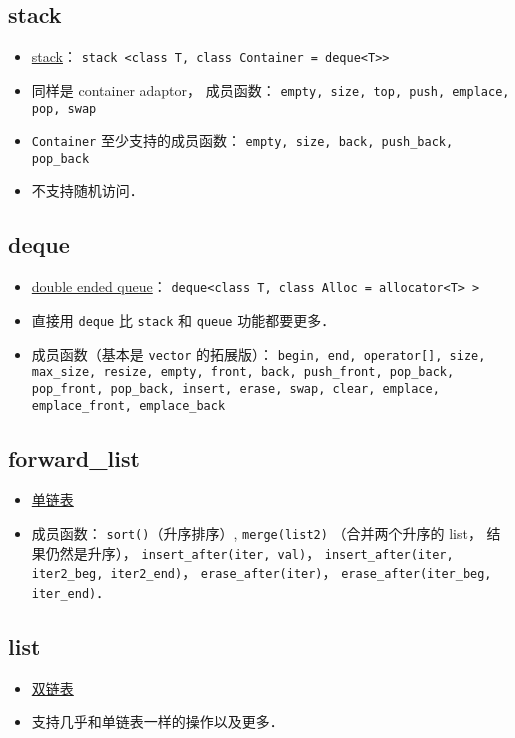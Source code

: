 \subsection{stack}
\begin{itemize}
\item \href{https://cplusplus.com/reference/stack/stack/}{stack}： \verb|stack <class T, class Container = deque<T>>|
\item 同样是 container adaptor， 成员函数： \verb|empty, size, top, push, emplace, pop, swap|
\item \verb|Container| 至少支持的成员函数： \verb|empty, size, back, push_back, pop_back|
\item 不支持随机访问．
\end{itemize}

\subsection{deque}
\begin{itemize}
\item \href{https://cplusplus.com/reference/deque/deque/}{double ended queue}： \verb|deque<class T, class Alloc = allocator<T> >|
\item 直接用 \verb|deque| 比 \verb|stack| 和 \verb|queue| 功能都要更多．
\item 成员函数（基本是 \verb|vector| 的拓展版）： \verb|begin, end, operator[], size, max_size, resize, empty, front, back, push_front, pop_back, pop_front, pop_back, insert, erase, swap, clear, emplace, emplace_front, emplace_back|
\end{itemize}

\subsection{forward\_list}
\begin{itemize}
\item \href{https://cplusplus.com/reference/forward_list/forward_list/}{单链表}
\item 成员函数： \verb|sort()|（升序排序）, \verb|merge(list2)| （合并两个升序的 list， 结果仍然是升序）， \verb|insert_after(iter, val)|，  \verb|insert_after(iter, iter2_beg, iter2_end)|， \verb|erase_after(iter)|， \verb|erase_after(iter_beg, iter_end)|．
\end{itemize}

\subsection{list}
\begin{itemize}
\item \href{https://cplusplus.com/reference/list/list/}{双链表}
\item 支持几乎和单链表一样的操作以及更多．
\end{itemize}
